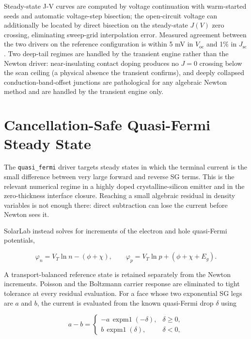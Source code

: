 \documentclass[
  11pt,
  american,
]{report}
\begin{document}
Steady-state J-V curves are computed by voltage continuation with
warm-started seeds and automatic voltage-step bisection; the
open-circuit voltage can additionally be located by direct bisection on
the steady-state \(J(V)\) zero crossing, eliminating sweep-grid
interpolation error. Measured agreement between the two drivers on the
reference configuration is within 5 mV in \(V_\mathrm{oc}\) and 1\% in
\(J_\mathrm{sc}\). Two deep-tail regimes are handled by the transient
engine rather than the Newton driver: near-insulating contact doping
produces no \(J = 0\) crossing below the scan ceiling (a physical
absence the transient confirms), and deeply collapsed
conduction-band-offset junctions are pathological for any algebraic
Newton method and are handled by the transient engine only.

\hypertarget{cancellation-safe-quasi-fermi-steady-state}{%
\section{Cancellation-Safe Quasi-Fermi Steady
State}\label{cancellation-safe-quasi-fermi-steady-state}}

The \texttt{quasi\_fermi} driver targets steady states in which the
terminal current is the small difference between very large forward and
reverse SG terms. This is the relevant numerical regime in a highly
doped crystalline-silicon emitter and in the zero-thickness interface
closure. Reaching a small algebraic residual in density variables is not
enough there: direct subtraction can lose the current before Newton sees
it.

SolarLab instead solves for increments of the electron and hole
quasi-Fermi potentials,

\begin{equation}
\label{eq:qf-potentials}
\varphi_n=V_T\ln n-(\phi+\chi),\qquad
\varphi_p=V_T\ln p+(\phi+\chi+E_g).
\end{equation}

A transport-balanced reference state is retained separately from the
Newton increments. Poisson and the Boltzmann carrier response are
eliminated to tight tolerance at every residual evaluation. For a face
whose two exponential SG legs are \(a\) and \(b\), the current is
evaluated from the known quasi-Fermi drop \(\delta\) using

\[
a-b=
\begin{cases}
-a\,\operatorname{expm1}(-\delta), & \delta\geq0,\\
b\,\operatorname{expm1}(\delta), & \delta<0,
\end{cases}
\]
\end{document}
